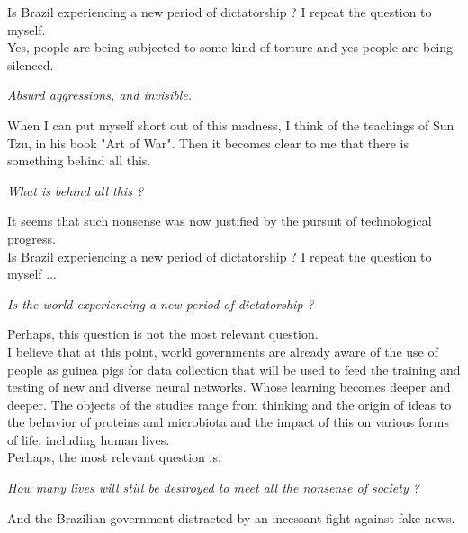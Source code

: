 \documentclass[11pt]{book}
\begin{document}
\noindent Is Brazil experiencing a new period of dictatorship ? I repeat the question to myself. \\
 
\noindent Yes, people are being subjected to some kind of torture and yes people are being silenced.

\noindent \begin{center} \emph{Absurd aggressions, and invisible.} \end{center}

\noindent When I can put myself short out of this madness, I think of the teachings of Sun Tzu, in his book "Art of War". Then it becomes clear to me that there is something behind all this.

\noindent \begin{center} \emph{What is behind all this ?} \end{center}

\noindent It seems that such nonsense was now justified by the pursuit of technological progress. \\

\noindent Is Brazil experiencing a new period of dictatorship ? I repeat the question to myself ...

\noindent \begin{center} \emph{Is the world experiencing a new period of dictatorship ?} \end{center}

\noindent Perhaps, this question is not the most relevant question. \\

\noindent I believe that at this point, world governments are already aware of the use of people as guinea pigs for data collection that will be used to feed the training and testing of new and diverse neural networks. Whose learning becomes deeper and deeper. The objects of the studies range from thinking and the origin of ideas to the behavior of proteins and microbiota and the impact of this on various forms of life, including human lives. \\

\noindent Perhaps, the most relevant question is:

\noindent \begin{center} \emph{How many lives will still be destroyed to meet all the nonsense of society ?} \end{center}

\noindent And the Brazilian government distracted by an incessant fight against fake news.
\end{document}
